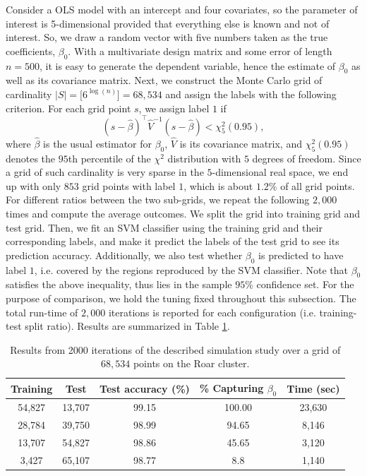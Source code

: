 \documentclass[12pt]{article}
\theoremstyle{definition}
\begin{document}
Consider a OLS model with an intercept and four covariates, so the parameter of interest is 5-dimensional provided that everything else is known and not of interest. So, we draw a random vector with five numbers taken as the true coefficients, $\beta_0$. With a multivariate design matrix and some error of length $n=500$, it is easy to generate the dependent variable, hence the estimate of $\beta_0$ as well as its covariance matrix. Next, we construct the Monte Carlo grid of cardinality $|S|=\bigg[6^{\log(n)}\bigg]=68,534$ and assign the labels with the following criterion. For each grid point $s$, we assign label $1$ if 
$$(s-\hat{\beta})^\top\hat{V}^{-1}(s-\hat{\beta})<\chi^2_5(0.95),$$
where $\hat{\beta}$ is the usual estimator for $\beta_0$, $\hat{V}$ is its covariance matrix, and $\chi^2_5(0.95)$ denotes the $95$th percentile of the $\chi^2$ distribution with $5$ degrees of freedom. Since a grid of such cardinality is very sparse in the $5$-dimensional real space, we end up with only $853$ grid points with label $1$, which is about $1.2\%$ of all grid points. For different ratios between the two sub-grids, we repeat the following $2,000$ times and compute the average outcomes. We split the grid into training grid and test grid. Then, we fit an SVM classifier using the training grid and their corresponding labels, and make it predict the labels of the test grid to see its prediction accuracy. Additionally, we also test whether $\beta_0$ is predicted to have label $1$, i.e. covered by the regions reproduced by the SVM classifier. Note that $\beta_0$ satisfies the above inequality, thus lies in the sample $95\%$ confidence set. For the purpose of comparison, we hold the tuning fixed throughout this subsection. The total run-time of $2,000$ iterations is reported for each configuration (i.e. training-test split ratio). Results are summarized in Table \ref{table_ols}. 

\begin{table}[H]
    \centering
    \begin{tabular}{ccccc}
        \hline
        Training & Test & Test accuracy (\%) & \% Capturing $\beta_0$ & Time (sec) \\
        \hline
        \hline
        54,827 & 13,707 & 99.15 & 100.00 & 23,630 \\
        28,784 & 39,750 & 98.99 & 94.65 & 8,146 \\
        13,707 & 54,827 & 98.86 & 45.65 & 3,120 \\
        3,427 & 65,107 & 98.77 & 8.8 & 1,140 \\
        \hline
    \end{tabular}
    \caption{Results from 2000 iterations of the described simulation study over a grid of $68,534$ points on the Roar cluster. }
    \label{table_ols}
\end{table}
\end{document}
